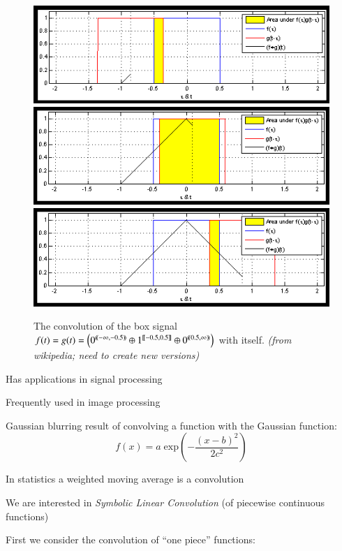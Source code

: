 \begin{figure}[h]
\label{convolution}
\caption[Convolution of box signal with itself]{The convolution of the box signal 
$f(t)=g(t)=\left( 0^{ (\!( -\infty,-0.5 )\!) } \oplus 1^{ [\![ -0.5,0.5 ]\!] } \oplus 0^{ (\!( 0.5,\infty )\!) } \right)$ with itself.
\emph{(from wikipedia; need to create new versions)}}
\centering
\includegraphics[scale=0.6]{diagrams/conv1}
\includegraphics[scale=0.6]{diagrams/conv2}
\includegraphics[scale=0.6]{diagrams/conv3}
\end{figure}

Has applications in signal processing

Frequently used in image processing

  Gaussian blurring result of convolving a function with the Gaussian function:
\begin{equation}
	f(x) = a \; \text{exp} \left( - \frac{(x-b)^2}{2c^2} \right)
\end{equation}

In statistics a weighted moving average is a convolution

We are interested in \emph{Symbolic Linear Convolution} (of piecewise continuous functions)

First we consider the convolution of ``one piece'' functions:

